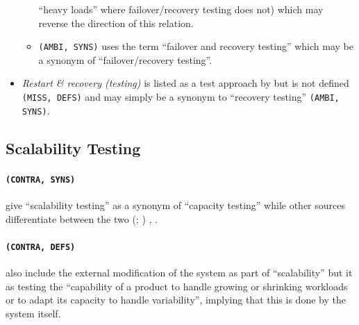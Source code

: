 \begin{itemize}
\begin{itemize}
                    ``heavy loads'' where failover/recovery testing does not)
                    which may reverse the direction of this relation.
              \item \texttt{(AMBI, SYNS)}
                     \citet[p.~56]{Firesmith2015} uses the term
                    ``failover and recovery testing'' which may be a synonym of
                    ``failover/recovery testing''.
          \end{itemize}
    \item \emph{Restart \& recovery (testing)} is listed as a test approach by
          \citet[Fig.~5]{Gerrard2000a} but is not defined \texttt{(MISS, DEFS)}
          and may simply be a synonym to ``recovery testing'' \texttt{(AMBI, SYNS)}.
\end{itemize}

\subsection{Scalability Testing}\label{scal-flaw}

\paragraph{\texttt{(CONTRA, SYNS)}}

\citeauthor{IEEE2021c} \citeyearpar[p.~39]{IEEE2021c} give
``scalability testing'' as a synonym of ``capacity testing''
while other sources differentiate between the two \ifnotpaper
    (\citealp[p.~53]{Firesmith2015}; \citealp[pp.~22\==23]{Bas2024})%
\else \cite[p.~53]{Firesmith2015}, \cite[pp.~22\==23]{Bas2024}\fi.

\paragraph{\texttt{(CONTRA, DEFS)}}

\citeauthor{IEEE2021c} \citeyearpar[p.~39]{IEEE2021c} also include the external
modification of the system as part of ``scalability'' but
\citet{ISO_IEC2023a}  it as testing the ``capability
of a product to handle growing or shrinking workloads or to adapt its capacity
to handle variability'', implying that this is done by the system itself.


